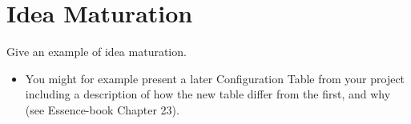 \section{Idea Maturation}
Give an example of idea maturation.


\begin{itemize}
\item You might for example present a later Configuration Table from your project including a description of how the new table differ from the first, and why (see Essence-book Chapter 23).
\end{itemize}